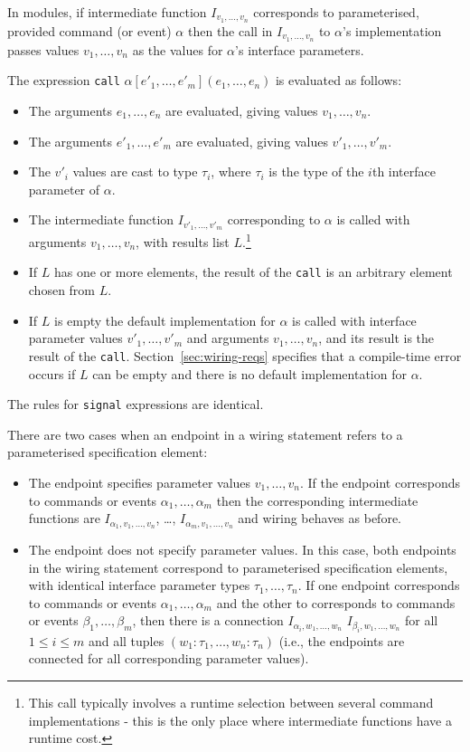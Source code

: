\documentclass[11pt]{article}
\newcommand{\code}[1]{{\tt #1}}
\begin{document}
In modules, if intermediate function $I_{v_1, \ldots, v_n}$ corresponds
to parameterised, provided command (or event) $\alpha$ then the call in
$I_{v_1, \ldots, v_n}$ to $\alpha$'s implementation passes values $v_1,
\ldots, v_n$ as the values for $\alpha$'s interface parameters. 

The expression \code{call} $\alpha[e'_1, \ldots, e'_m](e_1, \ldots, e_n)$
is evaluated as follows:
\begin{itemize}
\item The arguments $e_1, \ldots, e_n$ are evaluated, giving values $v_1,
\ldots, v_n$.
\item The arguments $e'_1, \ldots, e'_m$ are evaluated, giving values $v'_1,
\ldots, v'_m$.
\item The $v'_i$ values are cast to type $\tau_i$, where $\tau_i$ is the
type of the $i$th interface parameter of $\alpha$.
\item The intermediate function $I_{v'_1,\ldots,v'_m}$ corresponding to
$\alpha$ is called with arguments $v_1, \ldots, v_n$, with results list
$L$.\footnote{This call typically involves a runtime selection between
several command implementations - this is the only place where intermediate
functions have a runtime cost.}
\item If $L$ has one or more elements, the result of the \code{call} is an
arbitrary element chosen from $L$.
\item If $L$ is empty the default implementation for $\alpha$ is called
with interface parameter values $v'_1, \ldots, v'_m$ and arguments $v_1,
\ldots, v_n$, and its result is the result of the
\code{call}. Section~\ref{sec:wiring-reqs} specifies that a compile-time
error occurs if $L$ can be empty and there is no default implementation for
$\alpha$.
\end{itemize}
The rules for \code{signal} expressions are identical.

There are two cases when an endpoint in a wiring statement refers to a
parameterised specification element:
\begin{itemize}
\item The endpoint specifies parameter values $v_1, \ldots, v_n$. If the
endpoint corresponds to commands or events $\alpha_1, \ldots, \alpha_m$
then the corresponding intermediate functions are
$I_{\alpha_1,v_1,\ldots,v_n}$, \ldots, $I_{\alpha_m,v_1,\ldots,v_n}$ and
wiring behaves as before.
\item The endpoint does not specify parameter values. In this case, both
endpoints in the wiring statement correspond to parameterised specification
elements, with identical interface parameter types $\tau_1, \ldots,
\tau_n$. If one endpoint corresponds to commands or events $\alpha_1,
\ldots, \alpha_m$ and the other to corresponds to commands or events
$\beta_1, \ldots, \beta_m$, then there is a connection $I_{\alpha_i, w_1,
\ldots, w_n}$ \code{<->} $I_{\beta_i, w_1,\ldots, w_n}$ for all $1 \leq i
\leq m$ and all tuples $(w_1:\tau_1, \ldots, w_n:\tau_n)$ (i.e., the
endpoints are connected for all corresponding parameter values).
\end{itemize}
\end{document}
